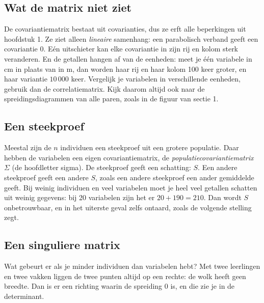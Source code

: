 \subsection{Wat de matrix niet ziet}

De covariantiematrix bestaat uit covarianties, dus ze erft alle beperkingen uit hoofdstuk 1. Ze ziet alleen \textit{lineaire} samenhang: een parabolisch verband geeft een covariantie 0. Eén uitschieter kan elke covariantie in zijn rij en kolom sterk veranderen. En de getallen hangen af van de eenheden: meet je één variabele in cm in plaats van in m, dan worden haar rij en haar kolom 100 keer groter, en haar variantie $10\,000$ keer. Vergelijk je variabelen in verschillende eenheden, gebruik dan de correlatiematrix. Kijk daarom altijd ook naar de spreidingsdiagrammen van alle paren, zoals in de figuur van sectie 1.

\subsection{Een steekproef}

Meestal zijn de $n$ individuen een steekproef uit een grotere populatie. Daar hebben de variabelen een eigen covariantiematrix, de \textit{populatiecovariantiematrix} $\Sigma$ (de hoofdletter sigma). De steekproef geeft een schatting: $S$. Een andere steekproef geeft een andere $S$, zoals een andere steekproef een ander gemiddelde geeft. Bij weinig individuen en veel variabelen moet je heel veel getallen schatten uit weinig gegevens: bij 20 variabelen zijn het er $20 + 190 = 210$. Dan wordt $S$ onbetrouwbaar, en in het uiterste geval zelfs ontaard, zoals de volgende stelling zegt.

\subsection{Een singuliere matrix}

Wat gebeurt er als je minder individuen dan variabelen hebt? Met twee leerlingen en twee vakken liggen de twee punten altijd op een rechte: de wolk heeft geen breedte. Dan is er een richting waarin de spreiding 0 is, en die zie je in de determinant.

